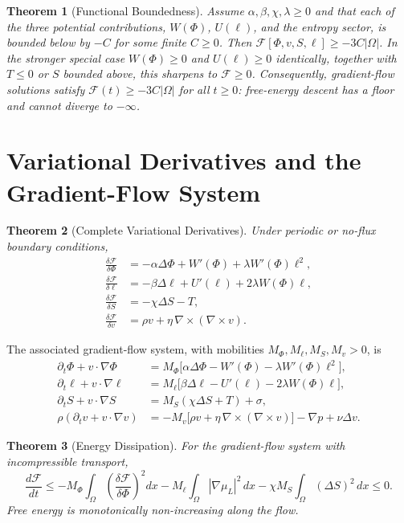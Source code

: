 \documentclass[11pt,fleqn]{book}
\numberwithin{equation}{chapter}
\theoremstyle{plain}
\newtheorem{theorem}{Theorem}[chapter]
\theoremstyle{definition}
\theoremstyle{remark}
\begin{document}
\begin{theorem}[Functional Boundedness]
Assume \(\alpha,\beta,\chi,\lambda\geq 0\) and that each of the three potential contributions, \(W(\Phi)\), \(U(\ell)\), and the entropy sector, is bounded below by \(-C\) for some finite \(C\geq 0\). Then \(\mathcal F[\Phi,v,S,\ell]\geq -3C|\Omega|\). In the stronger special case \(W(\Phi)\geq 0\) and \(U(\ell)\geq 0\) identically, together with \(T\leq 0\) or \(S\) bounded above, this sharpens to \(\mathcal F\geq 0\). Consequently, gradient-flow solutions satisfy \(\mathcal F(t)\geq -3C|\Omega|\) for all \(t\geq 0\): free-energy descent has a floor and cannot diverge to \(-\infty\).
\end{theorem}

\section{Variational Derivatives and the Gradient-Flow System}

\begin{theorem}[Complete Variational Derivatives]
Under periodic or no-flux boundary conditions,
\begin{align}
\frac{\delta\mathcal F}{\delta\Phi} &= -\alpha\Delta\Phi + W'(\Phi) + \lambda W'(\Phi)\ell^2, \\
\frac{\delta\mathcal F}{\delta\ell} &= -\beta\Delta\ell + U'(\ell) + 2\lambda W(\Phi)\ell, \\
\frac{\delta\mathcal F}{\delta S} &= -\chi\Delta S - T, \\
\frac{\delta\mathcal F}{\delta v} &= \rho v + \eta\,\nabla\times(\nabla\times v).
\end{align}
\end{theorem}

The associated gradient-flow system, with mobilities \(M_\Phi, M_\ell, M_S, M_v>0\), is
\begin{align}
\partial_t\Phi + v\cdot\nabla\Phi &= M_\Phi\bigl[\alpha\Delta\Phi - W'(\Phi) - \lambda W'(\Phi)\ell^2\bigr], \\
\partial_t\ell + v\cdot\nabla\ell &= M_\ell\bigl[\beta\Delta\ell - U'(\ell) - 2\lambda W(\Phi)\ell\bigr], \\
\partial_t S + v\cdot\nabla S &= M_S(\chi\Delta S + T) + \sigma, \\
\rho(\partial_t v + v\cdot\nabla v) &= -M_v\bigl[\rho v + \eta\,\nabla\times(\nabla\times v)\bigr] - \nabla p + \nu\Delta v.
\end{align}

\begin{theorem}[Energy Dissipation]
For the gradient-flow system with incompressible transport,
\[
\frac{d\mathcal F}{dt} \leq -M_\Phi\int_\Omega \left(\frac{\delta\mathcal F}{\delta\Phi}\right)^2 dx - M_\ell\int_\Omega |\nabla\mu_L|^2\,dx - \chi M_S \int_\Omega (\Delta S)^2\,dx \leq 0.
\]
Free energy is monotonically non-increasing along the flow.
\end{theorem}
\end{document}
